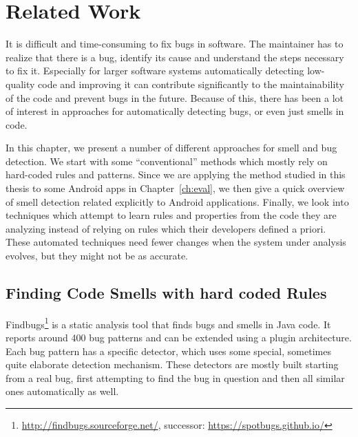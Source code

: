 \chapter{Related Work}\label{ch:relWork}


It is difficult and time-consuming to fix bugs in software.
The maintainer has to realize that there is a bug, identify its cause and understand the steps necessary to fix it.
Especially for larger software systems automatically detecting low-quality code and improving it can contribute significantly to the maintainability of the code and prevent bugs in the future.
Because of this, there has been a lot of interest in approaches for automatically detecting bugs, or even just smells in code.

In this chapter, we present a number of different approaches for smell and bug detection.
We start with some ``conventional'' methods which mostly rely on hard-coded rules and patterns.
Since we are applying the method studied in this thesis to some Android apps in Chapter~\ref{ch:eval}, we then give a quick overview of smell detection related explicitly to Android applications.
Finally, we look into techniques which attempt to learn rules and properties from the code they are analyzing instead of relying on rules which their developers defined a priori.
These automated techniques need fewer changes when the system under analysis evolves, but they might not be as accurate.

\section{Finding Code Smells with hard coded Rules}

Findbugs\footnote{\url{http://findbugs.sourceforge.net/}, successor: \url{https://spotbugs.github.io/}} is a static analysis tool that finds bugs and smells in Java code.
It reports around 400 bug patterns and can be extended using a plugin architecture.
Each bug pattern has a specific detector, which uses some special, sometimes quite elaborate detection mechanism.
These detectors are mostly built starting from a real bug, first attempting to find the bug in question and then all similar ones automatically as well.

